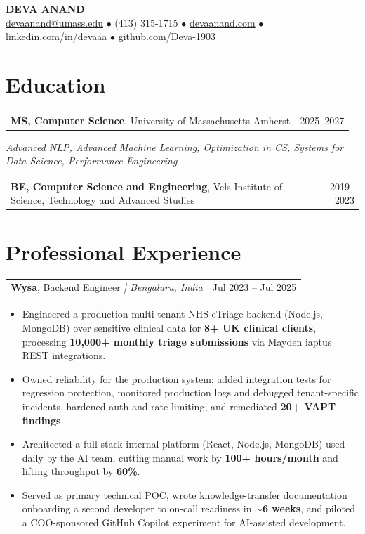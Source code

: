 \documentclass[letterpaper,11pt]{article}
\makeatletter
\newcommand{\eduItem}[3]{%
  \begin{tabular*}{\textwidth}{@{}l@{\extracolsep{\fill}}r@{}}
    \textbf{#1}, #2 & #3 \\
  \end{tabular*}\par
}
\newcommand{\expItem}[4]{%
  \vspace{3pt}
  \begin{tabular*}{\textwidth}{@{}l@{\extracolsep{\fill}}r@{}}
    \textbf{#1}, #2 \textit{| #3} & #4 \\
  \end{tabular*}\par\vspace{-2pt}
}
\makeatother
\begin{document}
\begin{center}
    {\fontsize{18}{20}\selectfont\bfseries DEVA ANAND}\\ \vspace{3pt}
    {\small
    \href{mailto:devaanand@umass.edu}{devaanand@umass.edu}
    \enspace$\bullet$\enspace
    (413) 315-1715
    \enspace$\bullet$\enspace
    \href{https://devaanand.com}{devaanand.com}
    \enspace$\bullet$\enspace
    \href{https://linkedin.com/in/devaaa/}{linkedin.com/in/devaaa}
    \enspace$\bullet$\enspace
    \href{https://github.com/Deva-1903}{github.com/Deva-1903}}
\end{center}
\vspace{-6pt}

\section{Education}
\eduItem{MS, Computer Science}{University of Massachusetts Amherst}{2025--2027}
{\small\textit{Advanced NLP, Advanced Machine Learning, Optimization in CS, Systems for Data Science, Performance Engineering}}\par
\vspace{3pt}
\eduItem{BE, Computer Science and Engineering}{Vels Institute of Science, Technology and Advanced Studies}{2019--2023}

\section{Professional Experience}

\expItem{\href{https://www.wysa.io}{Wysa}}{Backend Engineer}{Bengaluru, India}{Jul 2023 -- Jul 2025}
\begin{itemize}
  \item Engineered a production multi-tenant NHS eTriage backend (Node.js, MongoDB) over sensitive clinical data for \textbf{8+ UK clinical clients}, processing \textbf{10{,}000+ monthly triage submissions} via Mayden iaptus REST integrations.
  \item Owned reliability for the production system: added integration tests for regression protection, monitored production logs and debugged tenant-specific incidents, hardened auth and rate limiting, and remediated \textbf{20+ VAPT findings}.
  \item Architected a full-stack internal platform (React, Node.js, MongoDB) used daily by the AI team, cutting manual work by \textbf{100+ hours/month} and lifting throughput by \textbf{60\%}.
  \item Served as primary technical POC, wrote knowledge-transfer documentation onboarding a second developer to on-call readiness in \textbf{$\sim$6 weeks}, and piloted a COO-sponsored GitHub Copilot experiment for AI-assisted development.
\end{itemize}
\end{document}
